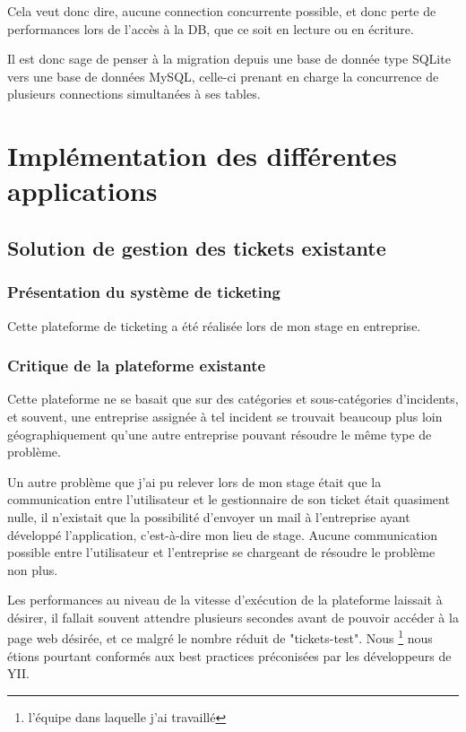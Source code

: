 \documentclass[12pt,table,a4paper]{report}
\begin{document}
Cela veut donc dire, aucune connection concurrente possible, et donc perte de performances lors de l'accès à la DB, que ce soit en lecture ou en écriture.

Il est donc sage de penser à la migration depuis une base de donnée type SQLite vers une base de données MySQL, celle-ci prenant en charge la concurrence de plusieurs connections simultanées à ses tables.


\chapter{Implémentation des différentes applications}

\section{Solution de gestion des tickets existante}

\subsection{Présentation du système de ticketing}
Cette plateforme de ticketing a été réalisée lors de mon stage en entreprise.

\subsection{Critique de la plateforme existante}
Cette plateforme ne se basait que sur des catégories et sous-catégories d'incidents, et souvent, une entreprise assignée à tel incident se trouvait beaucoup plus loin géographiquement qu'une autre entreprise pouvant résoudre le même type de problème.

Un autre problème que j'ai pu relever lors de mon stage était que la communication entre l'utilisateur et le gestionnaire de son ticket était quasiment nulle, il n'existait que la possibilité d'envoyer un mail à l'entreprise ayant développé l'application, c'est-à-dire mon lieu de stage. Aucune communication possible entre l'utilisateur et l'entreprise se chargeant de résoudre le problème non plus.

Les performances au niveau de la vitesse d'exécution de la plateforme laissait à désirer, il fallait souvent attendre plusieurs secondes avant de pouvoir accéder à la page web désirée, et ce malgré le nombre réduit de "tickets-test". Nous \footnote{l'équipe dans laquelle j'ai travaillé} nous étions pourtant conformés aux best practices préconisées par les développeurs de YII.
\end{document}
